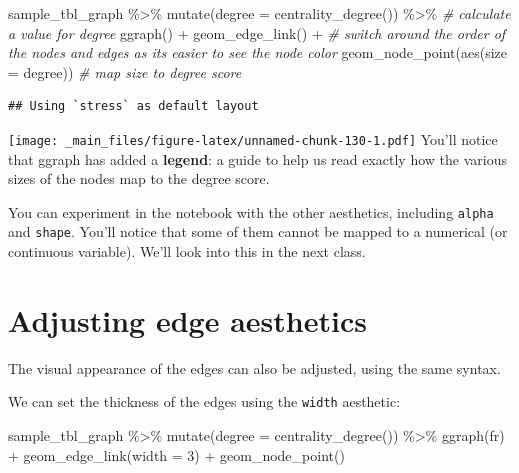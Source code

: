 \documentclass[
]{book}
\newenvironment{Shaded}{\begin{snugshade}}{\end{snugshade}}
\newcommand{\AttributeTok}[1]{\textcolor[rgb]{0.77,0.63,0.00}{#1}}
\newcommand{\CommentTok}[1]{\textcolor[rgb]{0.56,0.35,0.01}{\textit{#1}}}
\newcommand{\DecValTok}[1]{\textcolor[rgb]{0.00,0.00,0.81}{#1}}
\newcommand{\FunctionTok}[1]{\textcolor[rgb]{0.00,0.00,0.00}{#1}}
\newcommand{\NormalTok}[1]{#1}
\newcommand{\SpecialCharTok}[1]{\textcolor[rgb]{0.00,0.00,0.00}{#1}}
\newcommand{\StringTok}[1]{\textcolor[rgb]{0.31,0.60,0.02}{#1}}
\begin{document}
\begin{Shaded}
\begin{Highlighting}[]
\NormalTok{sample\_tbl\_graph }\SpecialCharTok{\%\textgreater{}\%} 
  \FunctionTok{mutate}\NormalTok{(}\AttributeTok{degree =} \FunctionTok{centrality\_degree}\NormalTok{()) }\SpecialCharTok{\%\textgreater{}\%} \CommentTok{\# calculate a value for degree}
  \FunctionTok{ggraph}\NormalTok{() }\SpecialCharTok{+} 
  \FunctionTok{geom\_edge\_link}\NormalTok{() }\SpecialCharTok{+} \CommentTok{\# switch around the order of the nodes and edges as it\textquotesingle{}s easier to see the node color}
  \FunctionTok{geom\_node\_point}\NormalTok{(}\FunctionTok{aes}\NormalTok{(}\AttributeTok{size =}\NormalTok{ degree)) }\CommentTok{\# map size to degree score}
\end{Highlighting}
\end{Shaded}

\begin{verbatim}
## Using `stress` as default layout
\end{verbatim}

\texttt{[image: \_main\_files/figure-latex/unnamed-chunk-130-1.pdf]}
You'll notice that ggraph has added a \textbf{legend}: a guide to help us read exactly how the various sizes of the nodes map to the degree score.

You can experiment in the notebook with the other aesthetics, including \texttt{alpha} and \texttt{shape}. You'll notice that some of them cannot be mapped to a numerical (or continuous variable). We'll look into this in the next class.

\hypertarget{adjusting-edge-aesthetics}{%
\section{Adjusting edge aesthetics}\label{adjusting-edge-aesthetics}}

The visual appearance of the edges can also be adjusted, using the same syntax.

We can set the thickness of the edges using the \texttt{width} aesthetic:

\begin{Shaded}
\begin{Highlighting}[]
\NormalTok{sample\_tbl\_graph }\SpecialCharTok{\%\textgreater{}\%} 
  \FunctionTok{mutate}\NormalTok{(}\AttributeTok{degree =} \FunctionTok{centrality\_degree}\NormalTok{()) }\SpecialCharTok{\%\textgreater{}\%} 
  \FunctionTok{ggraph}\NormalTok{(}\StringTok{\textquotesingle{}fr\textquotesingle{}}\NormalTok{) }\SpecialCharTok{+} 
  \FunctionTok{geom\_edge\_link}\NormalTok{(}\AttributeTok{width =} \DecValTok{3}\NormalTok{) }\SpecialCharTok{+} 
  \FunctionTok{geom\_node\_point}\NormalTok{()}
\end{Highlighting}
\end{Shaded}
\end{document}
